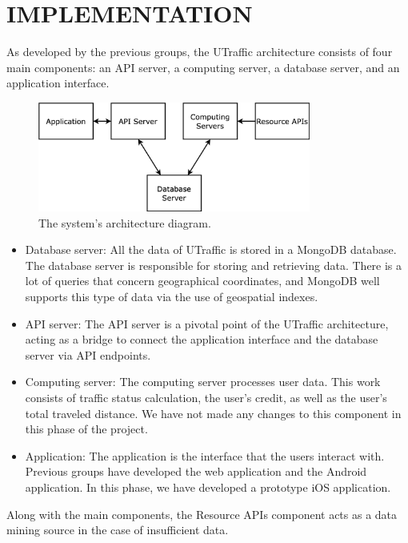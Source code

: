 %
%
\section{IMPLEMENTATION}
\label{section:implementation}

As developed by the previous groups, the UTraffic architecture consists of four main components: an API server, a computing server, a database server, and an application interface. 

\begin{figure}[H]
    \centering
    \includegraphics[width=0.8\textwidth]{assets/images/Implementation/system_architecture_diagram.png}
    \caption{The system's architecture diagram.}
    \label{fig:utraffic_architecture}
\end{figure}

\begin{itemize}
    \item Database server: All the data of UTraffic is stored in a MongoDB database. The database server is responsible for storing and retrieving data. There is a lot of queries that concern geographical coordinates, and MongoDB well supports this type of data via the use of geospatial indexes.
    \item API server: The API server is a pivotal point of the UTraffic architecture, acting as a bridge to connect the application interface and the database server via API endpoints.
    \item Computing server: The computing server processes user data. This work consists of traffic status calculation, the user's credit, as well as the user's total traveled distance. We have not made any changes to this component in this phase of the project.
    \item Application: The application is the interface that the users interact with. Previous groups have developed the web application and the Android application. In this phase, we have developed a prototype iOS application.
\end{itemize}
Along with the main components, the Resource APIs component acts as a data mining source in the case of insufficient data. 


